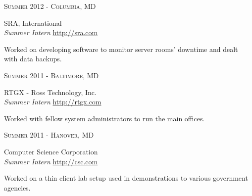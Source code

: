\documentclass[10pt]{article} %
\begin{document}
{\begin{minipage}[t]{0.5\textwidth}
{\raggedleft\textsc{Summer 2012 - Columbia, MD}\par}

{\raggedright\large SRA, International \\
\textit{Summer Intern} \hfill {\small \href{http://sra.com}{http://sra.com}} \\[5pt]}

\normalsize{Worked on developing software to monitor server rooms' downtime 
and dealt with data backups.}\\


{\raggedleft\textsc{Summer 2011 - Baltimore, MD}\par}

{\raggedright\large RTGX - Ross Technology, Inc. \\
\textit{Summer Intern} \hfill {\small \href{http://rtgx.com}{http://rtgx.com}} \\[5pt]}

\normalsize{Worked with fellow system administrators to run the main offices.} \\


{\raggedleft\textsc{Summer 2011 - Hanover, MD}\par}

{\raggedright\large Computer Science Corporation \\
    \textit{Summer Intern } \hfill {\small \href{http://cscc.om}{http://csc.com}} \\[5pt]} 

\normalsize{ Worked on a thin client lab setup used in demonstrations to various government agencies.} \\

\end{minipage} %
\hfill
\begin{minipage}[t]{0.44\textwidth} %
\vspace{0pt} %



\end{minipage}}
\end{document}
